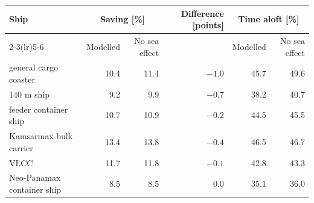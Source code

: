 \begin{tabular}{@{}lrrrrr@{}}
\toprule
Ship & \multicolumn{2}{c}{Saving [\%]} & Difference [points] & \multicolumn{2}{c}{Time aloft [\%]} \\
\cmidrule(lr){2-3}\cmidrule(lr){5-6}
 & Modelled & No sea effect & & Modelled & No sea effect \\
\midrule
general cargo coaster & 10.4 & 11.4 & \(-1.0\) & 45.7 & 49.6 \\
140 m ship & 9.2 & 9.9 & \(-0.7\) & 38.2 & 40.7 \\
feeder container ship & 10.7 & 10.9 & \(-0.2\) & 44.5 & 45.5 \\
Kamsarmax bulk carrier & 13.4 & 13.8 & \(-0.4\) & 46.5 & 46.7 \\
VLCC & 11.7 & 11.8 & \(-0.1\) & 42.8 & 43.3 \\
Neo-Panamax container ship & 8.5 & 8.5 & \(0.0\) & 35.1 & 36.0 \\
\bottomrule
\end{tabular}
